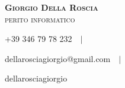 \documentclass[a4paper, 10pt, oneside]{article}
\newcommand*{\img}[1]{
        \raisebox{-.3\baselineskip}{
            \texttt{[image: \#1]}
        }
    }
\begin{document}
    \begin{center}
        \huge{\textbf{\textsc{Giorgio Della Roscia}}}\\
        \Large{\textsc{perito informatico}}\\[3mm]
        \normalsize{
            \img{phone}+39 346 79 78 232$\quad\vert\quad$
            \img{email}dellarosciagiorgio@gmail.com$\quad\vert\quad$
            \img{github}dellarosciagiorgio
        }
    \end{center}
    
    
    
    
\end{document}
